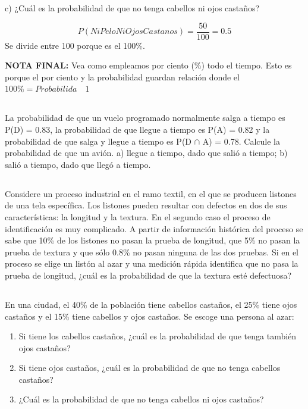 \documentclass[11pt,letterpaper]{report}
\begin{document}
         c) ¿Cuál es la probabilidad de que no tenga cabellos ni ojos castaños?

         $$P(NiPeloNiOjosCastanos)=\dfrac{50}{100}=0.5$$
         Se divide entre 100 porque es el 100\%.

         \textbf{NOTA FINAL:} Vea como empleamos por ciento (\%) todo el tiempo. Esto es porque el por ciento y la probabilidad guardan relación donde el $100\% = Probabilida \quad 1$


      \subsection{}%
        La probabilidad de que un vuelo programado normalmente salga a tiempo es P(D) = 0.83, la probabilidad de que llegue a tiempo es P(A) = 0.82 y la probabilidad de que salga y llegue a tiempo es P(D $\cap$ A) = 0.78. Calcule la probabilidad de que un avión.
        a) llegue a tiempo, dado que salió a tiempo;
        b) salió a tiempo, dado que llegó a tiempo.

      \subsection{}%
        Considere un proceso industrial en el ramo textil, en el que se producen listones de una tela específica. Los listones pueden resultar con defectos en dos de sus características: la longitud y la textura. En el segundo caso el proceso de identificación es muy complicado. A partir de información histórica del proceso se sabe que 10\% de los listones no pasan la prueba de longitud, que 5\% no pasan la prueba de textura y que sólo 0.8\% no pasan ninguna de las dos pruebas. Si en el proceso se elige un listón al azar y una medición rápida identifica que no pasa la prueba de longitud, ¿cuál es la probabilidad de que la textura esté defectuosa?
      \subsection{}%
        En una ciudad, el 40\% de la población tiene cabellos castaños, el 25\% tiene ojos castaños y el 15\% tiene cabellos y ojos castaños. Se escoge una persona al azar:
        \begin{enumerate}
            \item Si tiene los cabellos castaños, ¿cuál es la probabilidad de que tenga también ojos castaños?
            \item Si tiene ojos castaños, ¿cuál es la probabilidad de que no tenga cabellos castaños?
            \item ¿Cuál es la probabilidad de que no tenga cabellos ni ojos castaños?
        \end{enumerate}
\end{document}
